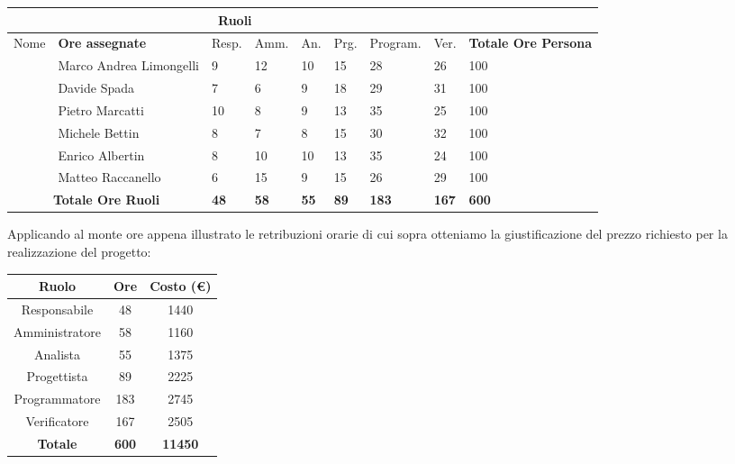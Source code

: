 \documentclass{article}
\begin{document}
{\vspace{1em}
 \hskip-0.2cm
\def\arraystretch{1.5}%
\begin{tabular}{ |p{0.8cm}|p{2.5cm}|p{0.8cm}|p{0.8cm}|p{0.8cm}|p{0.8cm}|p{1.3cm}|p{0.8cm}|p{3cm}|}
 \hline
 \multicolumn{8}{|c|}{Ruoli} & \\
 \hline
 \multirow{7}{3em}{Nome} 
 & \textbf{Ore assegnate} & Resp. & Amm. & An. & Prg. & Program. & Ver. & \textbf{Totale Ore Persona}\\ \cline{2-9}
 & Marco Andrea Limongelli & 9 & 12 & 10 & 15 & 28 & 26 & 100\\ \cline{2-9}
 & Davide Spada & 7 & 6 & 9 & 18 & 29 & 31 & 100\\ \cline{2-9}
 & Pietro Marcatti & 10 & 8 & 9 & 13 & 35 & 25 & 100\\ \cline{2-9}
 & Michele Bettin & 8 & 7 & 8 & 15 & 30 & 32 & 100\\ \cline{2-9}
 & Enrico Albertin & 8 & 10 & 10 & 13 & 35 & 24 & 100\\ \cline{2-9}
 & Matteo Raccanello & 6 & 15 & 9 & 15 & 26 & 29 & 100\\ \cline{1-9}
 \multicolumn{2}{|c|}{\textbf{Totale Ore Ruoli}} & \textbf{48} & \textbf{58} & \textbf{55} & \textbf{89} & \textbf{183} & \textbf{167} & \textbf{600}\\ \hline
\end{tabular}
\vspace{2em}

 \noindent Applicando al monte ore appena illustrato le retribuzioni orarie di cui sopra otteniamo la giustificazione del prezzo richiesto per la realizzazione del progetto:
 
\vspace{2em}
\hskip -0.2cm
\begin{tabular}{|c|c|c|}
    \hline
     Ruolo &  Ore & Costo (€)\\\hline
     Responsabile & 48 & 1440\\\hline
     Amministratore & 58 & 1160\\\hline
     Analista & 55 & 1375\\\hline
     Progettista & 89 & 2225\\\hline
     Programmatore & 183 & 2745\\\hline
     Verificatore & 167 & 2505\\\hline
     \textbf{Totale} & \textbf{600} & \textbf{11450}\\\hline
\end{tabular}


}
\end{document}
